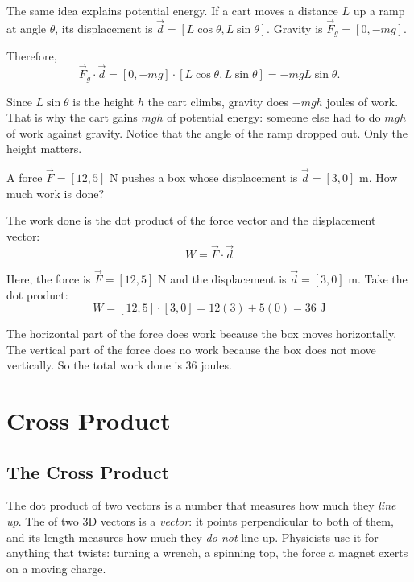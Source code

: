 The same idea explains potential energy. If a cart moves a distance $L$ up a ramp at angle $\theta$, its displacement is
$\vec{d} = [L\cos\theta, L\sin\theta]$. Gravity is $\vec{F}_g = [0, -mg]$.

Therefore,
$$\vec{F}_g \cdot \vec{d} = [0, -mg] \cdot [L\cos\theta, L\sin\theta]
= -mgL\sin\theta.$$

Since $L\sin\theta$ is the height $h$ the cart climbs, gravity does
$-mgh$ joules of work. That is why the cart gains $mgh$ of potential
energy: someone else had to do $mgh$ of work against gravity. Notice that
the angle of the ramp dropped out. Only the height matters.

\begin{Exercise}[title={Work done on a Box}, label={ex:work_pll}]
A force $\vec{F} = [12, 5]$ N pushes a box whose displacement is
$\vec{d} = [3, 0]$ m. How much work is done?
\end{Exercise}

\begin{Answer}[ref={ex:work_pll}]
The work done is the dot product of the force vector and the displacement vector:
\[
W = \vec{F} \cdot \vec{d}
\]

Here, the force is $\vec{F} = [12, 5]$ N and the displacement is
$\vec{d} = [3, 0]$ m. Take the dot product:
\[
W = [12, 5] \cdot [3, 0] = 12(3) + 5(0) = 36 \text{ J}
\]

The horizontal part of the force does work because the box moves horizontally.
The vertical part of the force does no work because the box does not move
vertically. So the total work done is $36$ joules.
\end{Answer}


\section{Cross Product}
\subsection{The Cross Product}
The dot product of two vectors is a number that measures how much they
\emph{line up}. The  of two 3D vectors is a
\emph{vector}: it points perpendicular to both of them, and its length
measures how much they \emph{do not} line up. Physicists use it for
anything that twists: turning a wrench, a spinning top, the force a magnet
exerts on a moving charge.

